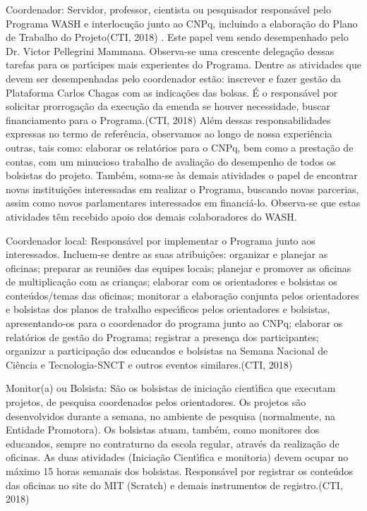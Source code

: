 \documentclass[
12pt,		%
openright,	%
twoside,  %
a4paper,			%
chapter=TITLE,		%
english,			%
french,				%
spanish,			%
brazil				%
]{USPSC-classe/USPSC}
\begin{document}
\begin{alineas}
\item Coordenador: \textquotedbl Servidor, professor, cientista ou pesquisador respons\'avel pelo Programa WASH e interlocu\c{c}\~ao junto ao CNPq, incluindo a elabora\c{c}\~ao do Plano de Trabalho do Projeto\textquotedbl   (CTI, 2018) . Este papel vem sendo desempenhado pelo Dr. Victor Pellegrini Mammana. Observa-se uma crescente delega\c{c}\~ao dessas tarefas para os part\'{\i}cipes mais experientes do Programa. Dentre as atividades que devem ser desempenhadas pelo coordenador est\~ao: \textquotedbl inscrever e fazer gest\~ao da Plataforma Carlos Chagas com as indica\c{c}\~oes das bolsas. \'E o respons\'avel por solicitar prorroga\c{c}\~ao da execu\c{c}\~ao da emenda se houver necessidade, buscar financiamento para o Programa.\textquotedbl   (CTI, 2018) Al\'em dessas responsabilidades expressas no termo de refer\^encia, observamos ao longo de nossa experi\^encia outras, tais como: elaborar os relat\'orios para o CNPq, bem como a presta\c{c}\~ao de contas, com um minucioso trabalho de avalia\c{c}\~ao do desempenho de todos os bolsistas do projeto. Tamb\'em, soma-se \`as demais atividades o papel de encontrar novas institui\c{c}\~oes interessadas em realizar o Programa, buscando novas parcerias, assim como novos parlamentares interessados em financi\'a-lo. Observa-se que estas atividades t\^em recebido apoio dos demais colaboradores do WASH.
\item Coordenador local: \textquotedbl Respons\'avel por implementar o Programa junto aos interessados. Incluem-se dentre as suas atribui\c{c}\~oes: organizar e planejar as oficinas; preparar as reuni\~oes das equipes locais; planejar e promover as oficinas de multiplica\c{c}\~ao com as crian\c{c}as; elaborar com os orientadores e bolsistas os conte\'udos/temas das oficinas; monitorar a elabora\c{c}\~ao conjunta pelos orientadores e bolsistas dos planos de trabalho espec\'{\i}ficos pelos orientadores e bolsistas, apresentando-os para o coordenador do programa junto ao CNPq; elaborar os relat\'orios de gest\~ao do Programa; registrar a presen\c{c}a dos participantes; organizar a participa\c{c}\~ao dos educandos e bolsistas na Semana Nacional de Ci\^encia e Tecnologia-SNCT e outros eventos similares.\textquotedbl   (CTI, 2018)
\item Monitor(a) ou Bolsista: \textquotedbl S\~ao os bolsistas de inicia\c{c}\~ao cient\'{\i}fica que executam projetos, de pesquisa coordenados pelos orientadores. Os projetos s\~ao desenvolvidos durante a semana, no ambiente de pesquisa (normalmente, na Entidade Promotora). Os bolsistas atuam, tamb\'em, como monitores dos educandos, sempre no contraturno da escola regular, atrav\'es da realiza\c{c}\~ao de oficinas. As duas atividades (Inicia\c{c}\~ao Cient\'{\i}fica e monitoria) devem ocupar no m\'aximo 15 horas semanais dos bolsistas. Respons\'avel por registrar os conte\'udos das oficinas no site do MIT (Scratch) e demais instrumentos de registro.\textquotedbl   (CTI, 2018)

\end{alineas}
\end{document}
